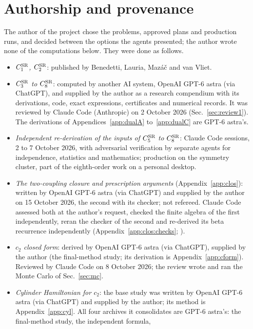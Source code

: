 \documentclass[11pt,a4paper]{article}
\numberwithin{equation}{section}
\newcommand{\CSR}{C^{\rm SR}}
\newcommand{\file}[1]{\path{#1}}
\begin{document}
\section{Authorship and provenance}\label{sec:prov}
The author of the project chose the problems, approved plans and production runs, and decided between the options
the agents presented; the author wrote none of the computations below. They were done as follows.
\begin{itemize}
\item \emph{$\CSR_1$, $\CSR_2$}: published by Benedetti, Lauria, Maz\'a\v c and van Vliet.
\item \emph{$\CSR_3$ to $\CSR_8$}: computed by another AI system, OpenAI GPT-6 astra (via ChatGPT), and supplied by the
 author as a research compendium with its derivations, code, exact expressions, certificates and numerical records. It
 was reviewed by Claude Code (Anthropic) on 2 October 2026 (Sec.~\ref{sec:review1}). The derivations of
 Appendices~\ref{app:dualA} to~\ref{app:dualC} are GPT-6 astra's.
\item \emph{Independent re-derivation of the inputs of $\CSR_5$ to $\CSR_8$}: Claude Code sessions, 2 to 7 October
 2026, with adversarial verification by separate agents for independence, statistics and mathematics; production on
 the symmetry cluster, part of the eighth-order work on a personal desktop.
\item \emph{The two-coupling closure and prescription arguments} (Appendix~\ref{app:clos}): written by OpenAI GPT-6
 astra (via ChatGPT) and supplied by the author on 15 October 2026, the second with its checker; not refereed. Claude
 Code assessed both at the author's request, checked the finite algebra of the first independently, reran the checker
 of the second and re-derived its beta recurrence independently (Appendix~\ref{app:clos:checks};
 \file{docs/closure_d1/REVIEWS.md}).
\item \emph{$c_2$ closed form}: derived by OpenAI GPT-6 astra (via ChatGPT), supplied by the author (the final-method
 study; its derivation is Appendix~\ref{app:cform}). Reviewed by Claude Code on 8 October 2026; the review wrote and
 ran the Monte Carlo of Sec.~\ref{sec:mc}.
\item \emph{Cylinder Hamiltonian for $c_2$}: the base study was written by OpenAI GPT-6 astra (via ChatGPT) and supplied
 by the author; its method is Appendix~\ref{app:cyl}. All four archives it consolidates are GPT-6 astra's: the final-method study, the independent formula,

\end{itemize}
\end{document}
